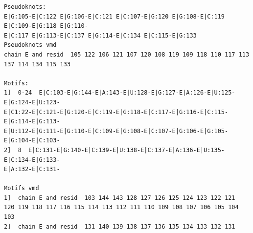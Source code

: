\documentclass[12pt]{article}
\begin{document}
\begin{appendices}
\begin{scriptsize}
\begin{lstlisting}
Pseudoknots:
E|G:105-E|C:122 E|G:106-E|C:121 E|C:107-E|G:120 E|G:108-E|C:119 E|C:109-E|G:118 E|G:110-
E|C:117 E|G:113-E|C:137 E|G:114-E|C:134 E|C:115-E|G:133 
Pseudoknots vmd
chain E and resid  105 122 106 121 107 120 108 119 109 118 110 117 113 137 114 134 115 133 

Motifs:
1]  0-24  E|C:103-E|G:144-E|A:143-E|U:128-E|G:127-E|A:126-E|U:125-E|G:124-E|U:123-
E|C1:22-E|C:121-E|G:120-E|C:119-E|G:118-E|C:117-E|G:116-E|C:115-E|G:114-E|G:113-
E|U:112-E|G:111-E|G:110-E|C:109-E|G:108-E|C:107-E|G:106-E|G:105-E|G:104-E|C:103-
2]  8  E|C:131-E|G:140-E|C:139-E|U:138-E|C:137-E|A:136-E|U:135-E|C:134-E|G:133-
E|A:132-E|C:131-

Motifs vmd
1]  chain E and resid  103 144 143 128 127 126 125 124 123 122 121
120 119 118 117 116 115 114 113 112 111 110 109 108 107 106 105 104 103 
2]  chain E and resid  131 140 139 138 137 136 135 134 133 132 131 



\end{lstlisting}
\end{scriptsize}
\end{appendices}
\end{document}
